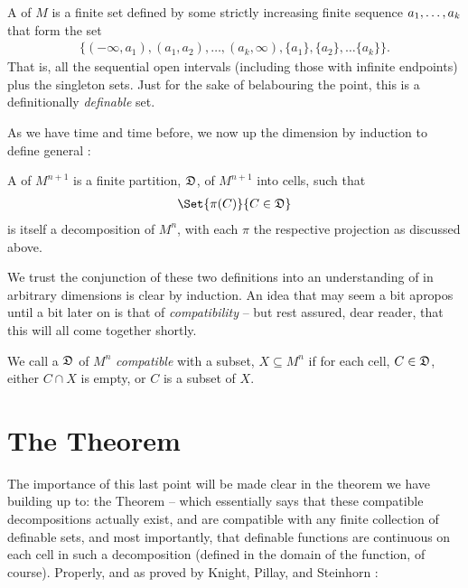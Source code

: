 \begin{definition}
  A \emph{\cd} of $M$ is a finite set defined by some strictly increasing finite sequence $a_1, \hdots, a_k$ that form the set
  \begin{align*}
    \{(- \infty, a_1), (a_1, a_2), \hdots, (a_k, \infty), \{a_1\}, \{a_2\}, \hdots \{a_k\} \}.
  \end{align*}
  That is, all the sequential open intervals (including those with infinite endpoints) plus the singleton sets. Just for the sake of belabouring the point, this is a definitionally \emph{definable} set.
\end{definition}

As we have time and time before, we now up the dimension by induction to define general \cds:

\begin{definition}
  A \cd of $M^{n+1}$ is a finite partition, $\mathfrak{D}$, of $M^{n+1}$ into cells, such that
  \begin{align*}
    \Set{\pi (C)}{C \in \fancyD}
  \end{align*}
  is itself a decomposition of $M^n$, with each $\pi$ the respective projection as discussed above.
\end{definition}


We trust the conjunction of these two definitions into an understanding of \cds in arbitrary dimensions is clear by induction.
An idea that may seem a bit apropos until a bit later on is that of \emph{compatibility} -- but rest assured, dear reader, that this will all come together shortly.

\begin{definition}[Compatibility]
  We call a \cd $\mathfrak{D}$ of $M^n$ \emph{compatible} with a subset, $X \subseteq M^n$ if for each cell, $C \in \mathfrak{D}$, either $C \cap X$ is empty, or $C$ is a subset of $X$.
\end{definition}


\section{The \CD Theorem}

The importance of this last point will be made clear in the theorem we have building up to: the \CD Theorem -- which essentially says that these compatible decompositions actually exist, and are compatible with any finite collection of definable sets, and most importantly, that definable functions are continuous on each cell in such a decomposition (defined in the domain of the function, of course). Properly, and as proved by Knight, Pillay, and Steinhorn \cite{knight_definable_1986}:

